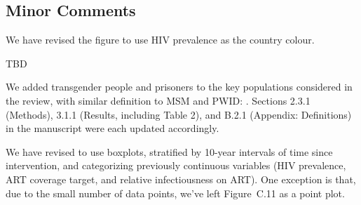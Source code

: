 \subsection{Minor Comments}
\begin{comment}
Figure 2: I would prefer HIV prevalence over PLHIV as the chloropleth.
\end{comment}
\begin{response}
We have revised the figure to use HIV prevalence as the country colour.
\end{response}
\begin{comment}
Do any studies address the age distribution of key populations? This would be useful to include.
\end{comment}
\begin{response}
TBD
\end{response}
\begin{comment}
Were transgender people or prisoners included in any studies?
\end{comment}
\begin{response}
We added transgender people and prisoners to the key populations considered in the review,
with similar definition to MSM and PWID: %
. %
Sections 2.3.1 (Methods), 3.1.1 (Results, including Table 2), and B.2.1 (Appendix: Definitions)
in the manuscript were each updated accordingly.
\end{response}
\begin{comment}
I find the bubble plots difficult to interpret. The bubbles are often similarly sized, I'm not sure the extra information adds to the results and crowds the plot. Perhaps grouped bar charts or grouped box plots would be easier to read - particularly for Figure 3.
\end{comment}
\begin{response}
We have revised to use boxplots,
stratified by 10-year intervals of time since intervention,
and categorizing previously continuous variables
(HIV prevalence, ART coverage target, and relative infectiousness on ART).
One exception is that, due to the small number of data points,
we've left Figure~C.11 as a point plot.
\end{response}
\begin{comment}
Consider inserting Table C.1 into the main text
\end{comment}
